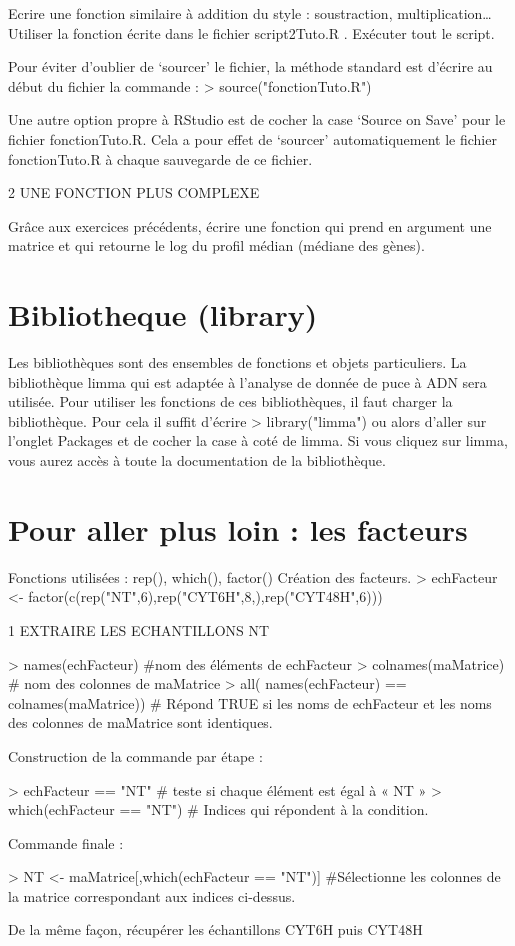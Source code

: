 Ecrire une fonction similaire à addition du style : soustraction, multiplication…
Utiliser la fonction écrite dans le fichier script2Tuto.R .
Exécuter tout le script.

Pour éviter d'oublier de ‘sourcer' le fichier, la méthode standard est d'écrire au début du fichier la commande  :
> source("fonctionTuto.R")

Une autre option propre à RStudio est de cocher la case ‘Source on Save' pour le fichier fonctionTuto.R. Cela a pour effet de ‘sourcer' automatiquement le fichier fonctionTuto.R à chaque sauvegarde de ce fichier.

2	UNE FONCTION PLUS COMPLEXE

Grâce aux exercices précédents, écrire une fonction qui prend en argument une matrice  et qui retourne le log du profil médian (médiane des gènes).















\section{Bibliotheque (library)}
Les bibliothèques sont des ensembles de fonctions et objets particuliers. La bibliothèque limma qui est adaptée à l'analyse de donnée de puce à ADN sera utilisée.
Pour utiliser les fonctions de ces bibliothèques, il faut charger la bibliothèque. Pour cela il suffit d'écrire
> library("limma")
ou alors d'aller sur l'onglet Packages et de cocher la case à coté de limma. Si vous cliquez sur limma, vous aurez accès à toute la documentation de la bibliothèque.

\section{Pour aller plus loin : les facteurs}
Fonctions utilisées : 
 rep(), which(), factor()
Création des facteurs.
> echFacteur <- factor(c(rep("NT",6),rep("CYT6H",8,),rep("CYT48H",6)))

1	EXTRAIRE LES ECHANTILLONS NT

> names(echFacteur) \#nom des éléments de echFacteur
> colnames(maMatrice) \# nom des colonnes de maMatrice
> all( names(echFacteur) == colnames(maMatrice)) \# Répond TRUE si les noms de echFacteur et les noms des colonnes de maMatrice sont identiques. 

Construction de la commande par étape :

> echFacteur == "NT"  \# teste si chaque élément est égal à « NT »
> which(echFacteur == "NT") \# Indices qui répondent à la condition.

Commande finale :

> NT <- maMatrice[,which(echFacteur == "NT")] \#Sélectionne les colonnes de la matrice correspondant aux indices ci-dessus.

De la même façon, récupérer les échantillons CYT6H puis CYT48H





